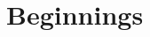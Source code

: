\documentclass[10pt,openany]{book}
\begin{document}
  \frontmatter
    

  \mainmatter
    \part{Beginnings}
\end{document}

